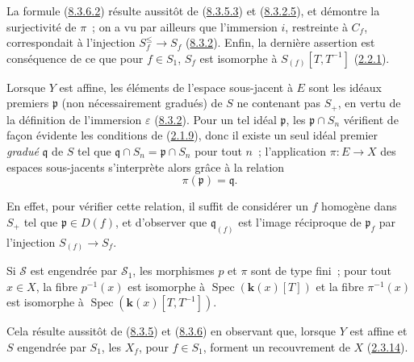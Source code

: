 La formule (\hyperref[II.8.3.6.2-fr]{8.3.6.2}) résulte aussitôt de
(\hyperref[II.8.3.5.3-fr]{8.3.5.3}) et
(\hyperref[II.8.3.2.5-fr]{8.3.2.5}), et démontre la surjectivité de $\pi$~; on
a vu par ailleurs que l'immersion $i$, restreinte à $C_f$, correspondait
à l'injection $S_f^{\leq}\to S_f$ (\hyperref[II.8.3.2-fr]{8.3.2}). Enfin, la
dernière assertion est conséquence de ce que pour $f\in S_1$, $S_f$ est
isomorphe à $S_{(f)}[T,T^{-1}]$ (\hyperref[II.2.2.1-fr]{2.2.1}).

\begin{remark}[8.3.7]
\label{II.8.3.7-fr}
Lorsque $Y$ est affine, les éléments de l'espace sous-jacent à $E$ sont les
idéaux premiers $\mathfrak{p}$ (non nécessairement gradués) de $S$ ne
contenant pas $S_+$, en vertu de la définition de l'immersion $\varepsilon$
(\hyperref[II.8.3.2-fr]{8.3.2}). Pour un tel idéal $\mathfrak{p}$, les
$\mathfrak{p}\cap S_n$ vérifient de façon évidente les conditions de
(\hyperref[II.2.1.9-fr]{2.1.9}), donc il existe un seul idéal premier
\emph{gradué} $\mathfrak{q}$ de $S$ tel que
$\mathfrak{q}\cap S_n=\mathfrak{p}\cap S_n$ pour tout $n$~; l'application
$\pi:E\to X$ des espaces sous-jacents s'interprète alors grâce à la relation
\begin{equation}
\label{II.8.3.7.1-fr}
  \pi(\mathfrak{p})=\mathfrak{q}.
\tag{8.3.7.1}
\end{equation}

En effet, pour vérifier cette relation, il suffit de considérer un $f$
homogène dans $S_+$ tel que $\mathfrak{p}\in D(f)$, et d'observer que
$\mathfrak{q}_{(f)}$ est l'image réciproque de $\mathfrak{p}_f$ par
l'injection $S_{(f)}\to S_f$.
\end{remark}

\begin{corollary}[8.3.8]
\label{II.8.3.8-fr}
Si $\mathcal{S}$ est engendrée par $\mathcal{S}_1$, les morphismes $p$ et
$\pi$ sont de type fini~; pour tout $x\in X$, la fibre $p^{-1}(x)$ est
isomorphe à $\operatorname{Spec}(\boldsymbol{k}(x)[T])$ et la fibre $\pi^{-1}(x)$ est
isomorphe à $\operatorname{Spec}(\boldsymbol{k}(x)[T,T^{-1}])$.
\end{corollary}

Cela résulte aussitôt de (\hyperref[II.8.3.5-fr]{8.3.5}) et
(\hyperref[II.8.3.6-fr]{8.3.6}) en observant que, lorsque $Y$ est affine et
$S$ engendrée par $S_1$, les $X_f$, pour $f\in S_1$, forment un recouvrement
de $X$ (\hyperref[II.2.3.14-fr]{2.3.14}).

